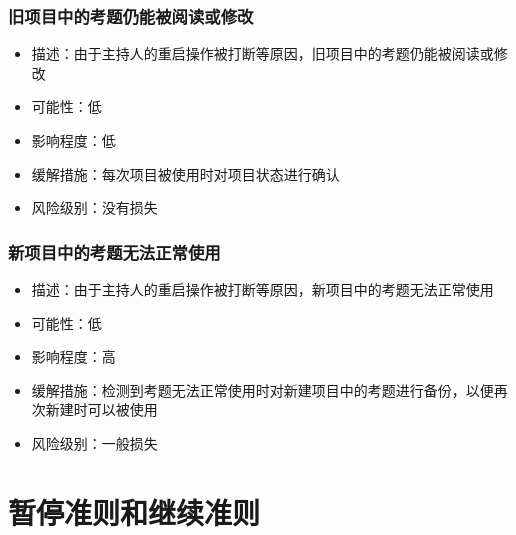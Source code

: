 \documentclass[hyperref, a4paper]{ctexart}
\providecommand{\tightlist}{%
  \setlength{\itemsep}{0pt}\setlength{\parskip}{0pt}}
\begin{document}
\hypertarget{ux65e7ux9879ux76eeux4e2dux7684ux8003ux9898ux4ecdux80fdux88abux9605ux8bfbux6216ux4feeux6539}{%
\subsubsection{旧项目中的考题仍能被阅读或修改}\label{ux65e7ux9879ux76eeux4e2dux7684ux8003ux9898ux4ecdux80fdux88abux9605ux8bfbux6216ux4feeux6539}}

\begin{itemize}
\tightlist
\item
  描述：由于主持人的重启操作被打断等原因，旧项目中的考题仍能被阅读或修改
\item
  可能性：低
\item
  影响程度：低
\item
  缓解措施：每次项目被使用时对项目状态进行确认
\item
  风险级别：没有损失
\end{itemize}

\hypertarget{ux65b0ux9879ux76eeux4e2dux7684ux8003ux9898ux65e0ux6cd5ux6b63ux5e38ux4f7fux7528}{%
\subsubsection{新项目中的考题无法正常使用}\label{ux65b0ux9879ux76eeux4e2dux7684ux8003ux9898ux65e0ux6cd5ux6b63ux5e38ux4f7fux7528}}

\begin{itemize}
\tightlist
\item
  描述：由于主持人的重启操作被打断等原因，新项目中的考题无法正常使用
\item
  可能性：低
\item
  影响程度：高
\item
  缓解措施：检测到考题无法正常使用时对新建项目中的考题进行备份，以便再次新建时可以被使用
\item
  风险级别：一般损失
\end{itemize}

\hypertarget{ux6682ux505cux51c6ux5219ux548cux7ee7ux7eedux51c6ux5219}{%
\section{暂停准则和继续准则}\label{ux6682ux505cux51c6ux5219ux548cux7ee7ux7eedux51c6ux5219}}
\end{document}
